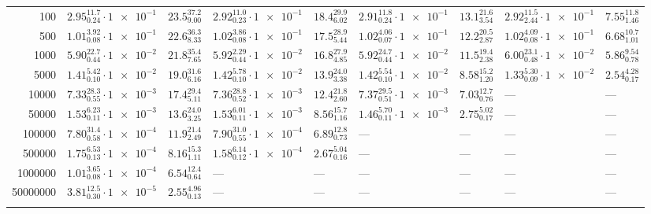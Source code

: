 \begin{table*}
\begin{tabular}{r|ll|ll|ll|ll}
    \rule{0pt}{2.6ex}\num{100}      & $2.95_{0.24}^{11.7}\cdot \num{1e-1}$ & $23.5_{9.00}^{37.2}$ & $2.92_{0.23}^{11.0}\cdot \num{1e-1}$ & $18.4_{6.02}^{29.9}$ & $2.91_{0.24}^{11.8}\cdot \num{1e-1}$ & $13.1_{3.54}^{21.6}$ & $2.92_{2.44}^{11.5}\cdot \num{1e-1}$ & $7.55_{1.46}^{11.8}$ \\
    \rule{0pt}{2.6ex}\num{500}      & $1.01_{0.08}^{3.92}\cdot \num{1e-1}$ & $22.6_{8.33}^{36.3}$ & $1.02_{0.08}^{3.86}\cdot \num{1e-1}$ & $17.5_{5.44}^{28.9}$ & $1.02_{0.07}^{4.06}\cdot \num{1e-1}$ & $12.2_{2.87}^{20.5}$ & $1.02_{0.08}^{4.09}\cdot \num{1e-1}$ & $6.68_{1.01}^{10.7}$ \\
    \rule{0pt}{2.6ex}\num{1000}     & $5.90_{0.44}^{22.7}\cdot \num{1e-2}$ & $21.8_{7.65}^{35.4}$ & $5.92_{0.44}^{2.29}\cdot \num{1e-2}$ & $16.8_{4.85}^{27.9}$ & $5.92_{0.44}^{24.7}\cdot \num{1e-2}$ & $11.5_{2.38}^{19.4}$ & $6.00_{0.48}^{23.1}\cdot \num{1e-2}$ & $5.86_{0.78}^{9.54}$ \\
    \rule{0pt}{2.6ex}\num{5000}     & $1.41_{0.10}^{5.42}\cdot \num{1e-2}$ & $19.0_{6.16}^{31.6}$ & $1.42_{0.10}^{5.78}\cdot \num{1e-2}$ & $13.9_{3.38}^{24.0}$ & $1.42_{0.10}^{5.54}\cdot \num{1e-2}$ & $8.58_{1.20}^{15.2}$ & $1.33_{0.09}^{5.30}\cdot \num{1e-2}$ & $2.54_{0.17}^{4.28}$ \\
    \rule{0pt}{2.6ex}\num{10000}    & $7.33_{0.55}^{28.3}\cdot \num{1e-3}$ & $17.4_{5.11}^{29.4}$ & $7.36_{0.52}^{28.8}\cdot \num{1e-3}$ & $12.4_{2.60}^{21.8}$ & $7.37_{0.51}^{29.5}\cdot \num{1e-3}$ & $7.03_{0.76}^{12.7}$ & --- & --- \\
    \rule{0pt}{2.6ex}\num{50000}    & $1.53_{0.11}^{6.23}\cdot \num{1e-3}$ & $13.6_{3.25}^{24.0}$ & $1.53_{0.11}^{6.01}\cdot \num{1e-3}$ & $8.56_{1.16}^{15.7}$ & $1.46_{0.11}^{5.70}\cdot \num{1e-3}$ & $2.75_{0.17}^{5.02}$ & --- & --- \\
    \rule{0pt}{2.6ex}\num{100000}   & $7.80_{0.58}^{31.4}\cdot \num{1e-4}$ & $11.9_{2.49}^{21.4}$ & $7.90_{0.55}^{31.0}\cdot \num{1e-4}$ & $6.89_{0.73}^{12.8}$ & --- & --- & --- & --- \\
    \rule{0pt}{2.6ex}\num{500000}   & $1.75_{0.13}^{6.53}\cdot \num{1e-4}$ & $8.16_{1.11}^{15.3}$ & $1.58_{0.12}^{6.14}\cdot \num{1e-4}$ & $2.67_{0.16}^{5.04}$ & --- & --- & --- & --- \\
    \rule{0pt}{2.6ex}\num{1000000}  & $1.01_{0.08}^{3.65}\cdot \num{1e-4}$ & $6.54_{0.64}^{12.4}$ & --- & --- & --- & --- & --- & --- \\
    \rule{0pt}{2.6ex}\num{50000000} & $3.81_{0.30}^{12.5}\cdot \num{1e-5}$ & $2.55_{0.13}^{4.96}$ & --- & --- & --- & --- & --- & --- \\
    \noalign{\smallskip}\hline
    \end{tabular}
    \end{table*}

\printbibliography




